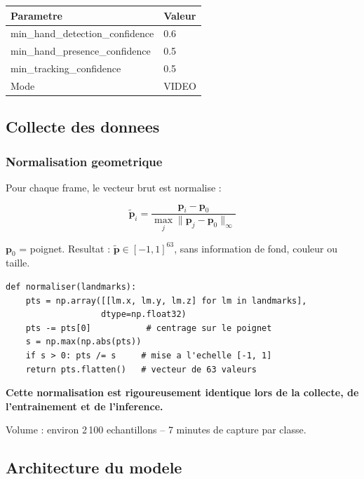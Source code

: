 \documentclass[12pt,a4paper]{article}
\begin{document}
\begin{center}
\begin{tabular}{ll}
\toprule
Parametre & Valeur \\
\midrule
min\_hand\_detection\_confidence & 0.6 \\
min\_hand\_presence\_confidence & 0.5 \\
min\_tracking\_confidence & 0.5 \\
Mode & VIDEO \\
\bottomrule
\end{tabular}
\end{center}

\subsection{Collecte des donnees}

\subsubsection{Normalisation geometrique}

Pour chaque frame, le vecteur brut est normalise :

\begin{equation}
\tilde{\mathbf{p}}_i =
\frac{\mathbf{p}_i - \mathbf{p}_0}
{\max_{j} \|\mathbf{p}_j - \mathbf{p}_0\|_\infty}
\end{equation}

$\mathbf{p}_0$ = poignet. Resultat : $\tilde{\mathbf{p}} \in [-1,1]^{63}$,
sans information de fond, couleur ou taille.

\begin{lstlisting}[caption={Normalisation des landmarks.}]
def normaliser(landmarks):
    pts = np.array([[lm.x, lm.y, lm.z] for lm in landmarks],
                   dtype=np.float32)
    pts -= pts[0]           # centrage sur le poignet
    s = np.max(np.abs(pts))
    if s > 0: pts /= s     # mise a l'echelle [-1, 1]
    return pts.flatten()   # vecteur de 63 valeurs
\end{lstlisting}

\textbf{Cette normalisation est rigoureusement identique
lors de la collecte, de l'entrainement et de l'inference.}

Volume : environ 2\,100 echantillons -- 7 minutes de capture par classe.

\subsection{Architecture du modele}
\end{document}
